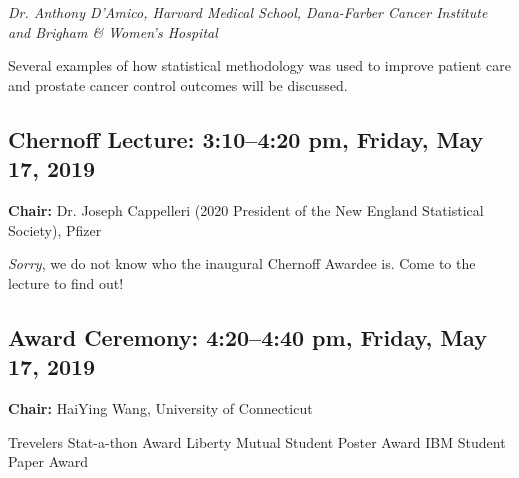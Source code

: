 \documentclass[10pt]{article}
\begin{document}
\emph{Dr. Anthony D'Amico, Harvard Medical School, Dana-Farber Cancer Institute and Brigham \& Women's Hospital}

Several examples of how statistical methodology was used to improve
patient care and prostate cancer control outcomes will be discussed.


\subsection*{Chernoff Lecture: \hfill 3:10--4:20 pm, Friday, May 17, 2019}
{\bf Chair:}
Dr. Joseph Cappelleri (2020 President of the New England
Statistical Society),  Pfizer

\emph{Sorry}, we do not know who the inaugural Chernoff Awardee is. Come to the
lecture to find out!

\subsection*{Award Ceremony: \hfill 4:20--4:40 pm, Friday, May 17, 2019}

{\bf Chair:} HaiYing Wang, University of Connecticut

Trevelers Stat-a-thon Award\hfill
Liberty Mutual Student Poster Award \hfill
IBM Student Paper Award

\clearpage

{}


\clearpage

\twocolumn
\raggedright



\clearpage

\end{document}
